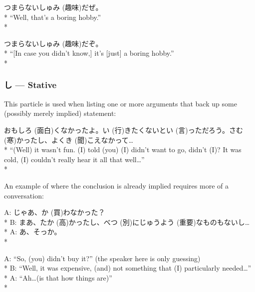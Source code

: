 \documentclass[11pt, b5paper, twoside, openright, onecolumn]{book}
\makeatletter
\newcommand*{\rubystack}[2]{{\relscale{0.5}%
  \begin{tabular}[b]{@{}c@{}}%
    {#1}\\%
   {\textscale{2}{#2}}%
  \end{tabular}}%
}
\DeclareRobustCommand*{\ruby}[2]{%
  \mbox{%
    \setlength{\parskip}{0ex}%
    \BeginAccSupp{method=pdfstringdef,ActualText={#1}}%
      \rubystack{\phantom{#2}}{#1}%
      \llap{%
        \rubystack{#2}{\phantom{#1}}%
      }%
    \EndAccSupp{}%
  }%
}
\renewcommand*{\ruby}[2]{#2 (#1)}%
\newenvironment{exampleblock}{
\setlength{\parindent}{0.6in}
\begin{minipage}[t]{\dimexpr\textwidth-\parindent}}
{\end{minipage}}
\makeatother
\begin{document}
\vspace{0.4cm}
\begin{exampleblock}
つまらない\ruby{趣味}{しゅみ}だぜ。 \\* 
“Well‚ that’s a boring hobby.” \\* 
\end{exampleblock}
\vspace{0.2cm}

\begin{exampleblock}
つまらない\ruby{趣味}{しゅみ}だぞ。 \\* 
“[In case you didn’t know‚] it’s [just] a boring hobby.” \\* 
\end{exampleblock}
\subsubsection{し — Stative}


This particle is used when listing one or more arguments that back up some (possibly merely implied) statement:

\vspace{0.4cm}
\begin{exampleblock}
\ruby{面白}{おもしろ}くなかったよ。\ruby{行}{い}きたくないと\ruby{言}{い}っただろう。\ruby{寒}{さむ}かったし、よく\ruby{聞}{き}こえなかって… \\* 
“(Well) it wasn’t fun. (I) told (you) (I) didn’t want to go‚ didn’t (I)? It was cold‚ (I) couldn’t really hear it all that well…” \\* 
\end{exampleblock}
\vspace{0.2cm}

An example of where the conclusion is already implied requires more of a conversation:

\vspace{0.4cm}
\begin{exampleblock}
A: じゃあ、\ruby{買}{か}わなかった？ \\* 
B: まあ、\ruby{高}{たか}かったし、\ruby{別}{べつ}に\ruby{重要}{じゅうよう}なものもないし… \\* 
A: あ、そっか。 \\* 
\end{exampleblock}
\vspace{0.2cm}

\begin{exampleblock}
A: “So‚ (you) didn’t buy it?” (the speaker here is only guessing) \\* 
B: “Well‚ it was expensive‚ (and) not something that (I) particularly needed…” \\* 
A: “Ah…(is that how things are)” \\* 
\end{exampleblock}
\vspace{0.2cm}
\end{document}
